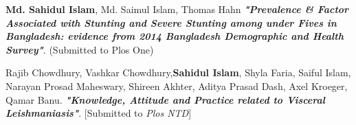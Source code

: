 \begin{cvparagraph}
\begin{enumerate}[label={[\arabic*]}]
		\item {\textbf{Md.  Sahidul Islam}, Md. Saimul Islam, Thomas Hahn  \textbf{\textit{"Prevalence \& Factor Associated with Stunting and Severe Stunting among under Fives in Bangladesh: evidence from 2014 Bangladesh Demographic and Health Survey"}}. (Submitted to Plos One)}	

		\item {Rajib Chowdhury, Vashkar Chowdhury,\textbf{Sahidul Islam},  Shyla Faria, Saiful Islam, Narayan Prosad Maheswary, Shireen Akhter, Aditya Prasad Dash, Axel Kroeger, Qamar Banu.  \textbf{\textit{"Knowledge, Attitude and Practice related to Visceral Leishmaniasis"}}. [Submitted to \textit{Plos NTD}]}	
\end{enumerate}
\end{cvparagraph}

